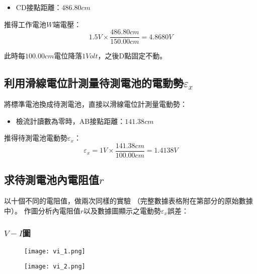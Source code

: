 \documentclass[12pt]{article}
\begin{document}
                \begin{itemize}
                    \item CD接點距離：$486.80cm$
                \end{itemize}

                推得工作電池$W$端電壓：
                $$1.5V\times \frac{486.80cm}{150.00cm}=4.8680V$$

                此時每$100.00cm$電位降落$1Volt$，之後D點固定不動。

            \subsection{利用滑線電位計測量待測電池的電動勢$\varepsilon_x$}
                
                將標準電池換成待測電池，直接以滑線電位計測量電動勢：

                \begin{itemize}
                    \item 檢流計讀數為零時，AB接點距離：$141.38cm$
                \end{itemize}

                推得待測電池電動勢$\varepsilon_x$：
                $$\varepsilon_x = 1V\times \frac{141.38cm}{100.00cm}=1.4138V$$
                
            \newpage
            \subsection{求待測電池內電阻值$r$}

                以十個不同的電阻值，做兩次同樣的實驗
                （完整數據表格附在第\xCJKnumber{\ref{sec:data}}部分的原始數據中）。
                作圖分析內電阻值$r$以及數據圖顯示之電動勢$\varepsilon_x$誤差：

                \subsubsection{$V-I$圖}

                \begin{figure}[h]
                    \begin{minipage}{0.99\textwidth}
                        \centering

                        \texttt{[image: vi\_1.png]}
                        \caption{}
                        \label{fig:vi_1}
                    \end{minipage}
                    \begin{minipage}{0.99\textwidth}
                        \centering

                        \texttt{[image: vi\_2.png]}
                        \caption{}
                        \label{fig:vi_2}
                    \end{minipage}
                \end{figure}
\end{document}

